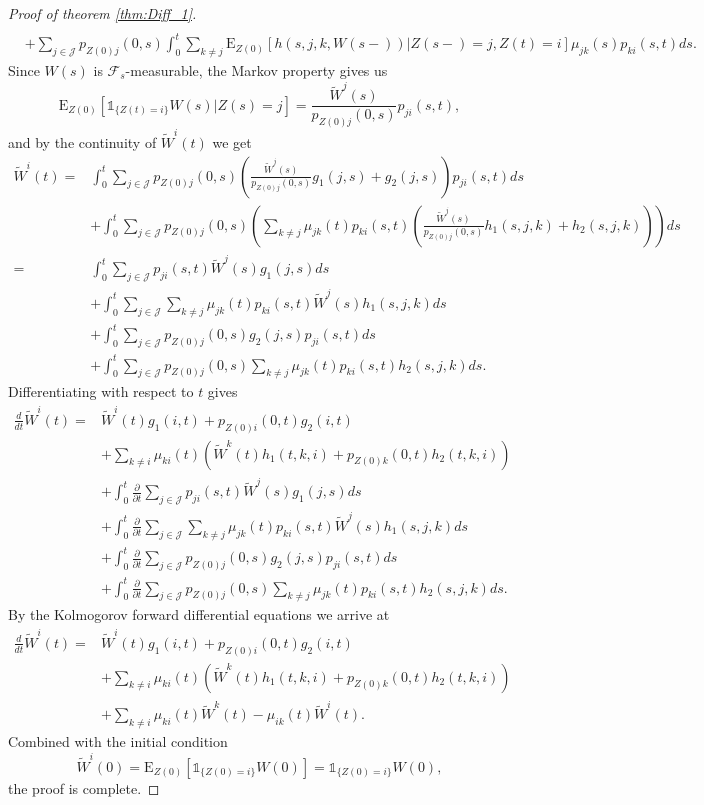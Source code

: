 \documentclass[12pt]{article}
\newcommand{\E}{\text{E}}
\newcommand{\indic}[1]{\mathds{1}_{ \{ #1 \} }}
\theoremstyle{my_thm}
\begin{document}
\begin{proof}[Proof of theorem \ref{thm:Diff_1}]
\begin{align*}
\\
&+
\sum_{j \in \mathcal{J}} p_{Z(0)j}(0,s)  \int_0^t \sum_{k \neq j }   \E_{Z(0)} \left[ h(s,j,k,W(s-))  |Z(s-)=j,Z(t)=i \right] \mu_{jk}(s)p_{ki}(s,t) ds.
\end{align*}
Since $W(s)$ is $\mathcal{F}_s$-measurable, the Markov property gives us
$$
\E_{Z(0)}[\indic{Z(t)=i}W(s)|Z(s)=j]=\frac{\tilde{W}^j(s)}{p_{Z(0)j}(0,s)}p_{ji}(s,t), 
$$
and by the continuity of $\tilde{W}^i(t)$ we get
\begin{align*}
\tilde{W}^i(t)=&
\int_0^t \sum_{j \in \mathcal{J}} p_{Z(0)j}(0,s)\left( \frac{\tilde{W}^j(s)}{p_{Z(0)j}(0,s)}g_1(j,s)+g_2(j,s)\right)p_{ji}(s,t) ds
\\
&+
\int_0^t \sum_{j \in \mathcal{J}} p_{Z(0)j}(0,s)  \left( \sum_{k \neq j}  \mu_{jk}(t)p_{ki}(s,t) \left(  \frac{\tilde{W}^j(s)}{p_{Z(0)j}(0,s)} h_1(s,j,k)+h_2(s,j,k)  \right) \right) ds
\\
=&
\int_0^t \sum_{j \in \mathcal{J}} p_{ji}(s,t) \tilde{W}^j(s)g_1(j,s) ds
\\
&+
\int_0^t \sum_{j \in \mathcal{J}} \sum_{k \neq j}  \mu_{jk}(t) p_{ki}(s,t) \tilde{W}^j(s) h_1(s,j,k)  ds
\\
&+
\int_0^t \sum_{j \in \mathcal{J}} p_{Z(0)j}(0,s)g_2(j,s)p_{ji}(s,t) ds
\\
&+
\int_0^t \sum_{j \in \mathcal{J}} p_{Z(0)j}(0,s)  \sum_{k \neq j}  \mu_{jk}(t) p_{ki}(s,t)h_2(s,j,k) ds.
\end{align*}
Differentiating with respect to $t$ gives
\begin{align*}
\frac{d}{dt}\tilde{W}^i(t)=&
 \tilde{W}^i(t)g_1(i,t)+p_{Z(0)i}(0,t)g_2(i,t)\\
&+
\sum_{k \neq i} \mu_{ki}(t) \left( \tilde{W}^k(t) h_1(t,k,i) + p_{Z(0)k}(0,t)h_2(t,k,i) \right)
\\
&+
\int_0^t \frac{\partial}{\partial t}  \sum_{j \in \mathcal{J}} p_{ji}(s,t) \tilde{W}^j(s)g_1(j,s) ds
\\
&+
\int_0^t \frac{\partial}{\partial t}  \sum_{j \in \mathcal{J}} \sum_{k \neq j}  \mu_{jk}(t) p_{ki}(s,t) \tilde{W}^j(s) h_1(s,j,k)  ds
\\
&+
\int_0^t \frac{\partial}{\partial t}  \sum_{j \in \mathcal{J}} p_{Z(0)j}(0,s)g_2(j,s)p_{ji}(s,t) ds
\\
&+
\int_0^t \frac{\partial}{\partial t} \sum_{j \in \mathcal{J}} p_{Z(0)j}(0,s)  \sum_{k \neq j}  \mu_{jk}(t) p_{ki}(s,t)h_2(s,j,k) ds.
\end{align*}
By the Kolmogorov forward differential equations we arrive at
\begin{align*}
\frac{d}{dt}\tilde{W}^i(t)=&
 \tilde{W}^i(t)g_1(i,t)+p_{Z(0)i}(0,t)g_2(i,t)\\
&+
\sum_{k \neq i} \mu_{ki}(t) \left( \tilde{W}^k(t) h_1(t,k,i) + p_{Z(0)k}(0,t)h_2(t,k,i) \right)
\\
&+
\sum_{k \neq i} \mu_{ki}(t) \tilde{W}^k(t)-\mu_{ik}(t)\tilde{W}^i(t).
\end{align*}
Combined with the initial condition
$$
\tilde{W}^i(0)=\E_{Z(0)}[\indic{Z(0)=i}W(0)]=\indic{Z(0)=i}W(0),
$$
the proof is complete.
\end{proof}
\end{document}
